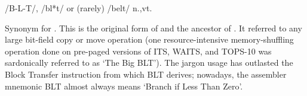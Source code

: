  /B-L-T/, /bl*t/ or (rarely) /belt/ n.,vt.

Synonym for . This is the original form of  and
the ancestor of . It referred to any large bit-field copy or
move operation (one resource-intensive memory-shuffling operation done on
pre-paged versions of ITS, WAITS, and TOPS-10 was sardonically referred to as
`The Big BLT'). The jargon usage has outlasted the 
Block 
Transfer instruction from which BLT  derives;
nowadays, the assembler mnemonic BLT  almost always means `Branch if Less Than Zero'.

